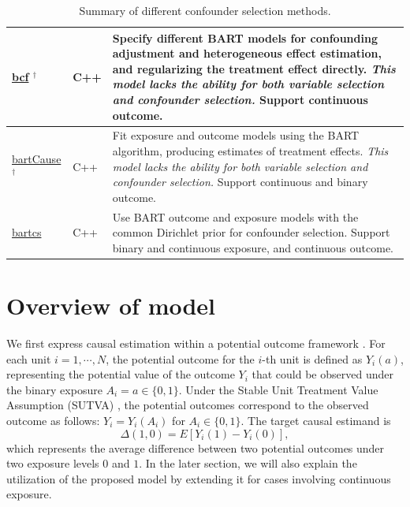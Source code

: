 \begin{table}[t!]
\begin{tabular}{p{4.9cm}lp{7.9cm}}
 \href{https://cran.r-project.org/package=bcf}{bcf} $^\dagger$  \citep{hahn2020bayesian}                      & C++       &
Specify different BART models for confounding adjustment and heterogeneous effect estimation, and regularizing the treatment effect directly. \emph{This model lacks the ability for both variable selection and confounder selection.} Support continuous outcome.
                                           \\
                                           \hline
\href{https://cran.r-project.org/package=bartCause}{bartCause}$^\dagger$   \citep{bartcause}                      & C++       & Fit exposure and outcome models using the BART
algorithm, producing estimates of treatment effects. \emph{This model lacks the ability for both variable selection and confounder selection.} Support continuous and binary outcome.
                                           \\
                                           \hline
 \href{https://CRAN.R-project.org/package=bartcs}{bartcs}   \citep{bartcs}                      & C++      & Use BART outcome and exposure models with the common Dirichlet prior for confounder selection. Support binary and continuous exposure, and continuous outcome.
                                           \\
                                           \hline
\end{tabular}
\caption{\label{tab:models}Summary of different confounder selection methods.}
\end{table}



\section{Overview of model}\label{sec:models}

We first express causal estimation within a potential outcome framework \citep{rubin1974estimating}. For each unit $i=1, \cdots, N$, the potential outcome for the $i$-th unit is defined as $Y_i(a)$, representing the potential value of the outcome $Y_i$ that could be observed under the binary exposure $A_i=a \in \{0,1\}$. Under the Stable Unit Treatment Value Assumption (SUTVA) \citep{rubin_discussion_1980}, the potential outcomes correspond to the observed outcome as follows:  $ Y_i = Y_i(A_i)$ for $A_i \in \{0, 1\} $. The target causal estimand is
\[\Delta(1,0) = E[Y_i(1) - Y_i(0)],\]
which represents the average difference between two potential outcomes under two exposure levels $0$ and $1$. In the later section, we will also explain the utilization of the proposed model by extending it for cases involving continuous exposure.

